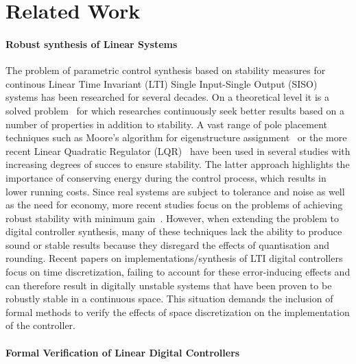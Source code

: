 \documentclass{sig-alternate-05-2015}
\begin{document}
\section{Related Work}

\paragraph{Robust synthesis of Linear Systems} 

The problem of parametric control synthesis based on stability measures for
continous Linear Time Invariant (LTI) Single Input-Single Output (SISO)
systems has been researched for several decades.  On a theoretical level it
is a solved problem~\cite{wonham1967pole} for which researches continuously
seek better results based on a number of properties in addition to
stability.  A vast range of pole placement techniques such as Moore's
algorithm for eigenstructure assignment~\cite{klein1977eigenvalue} or the
more recent Linear Quadratic Regulator (LQR)~\cite{bemporad2002explicit}
have been used in several studies with increasing degrees of succes to
ensure stability.  The latter approach highlights the importance of
conserving energy during the control process, which results in lower running
costs.  Since real systems are subject to tolerance and noise as well as the
need for economy, more recent studies focus on the problems of achieving
robust stability with minimum
gain~\cite{schmid2014unified,konigorski2012pole}.  However, when extending
the problem to digital controller synthesis, many of these techniques lack
the ability to produce sound or stable results because they disregard the
effects of quantisation and rounding.  Recent papers on
implementations/synthesis of LTI digital
controllers~\cite{das2013lqr,ghosh2013fpga} focus on time discretization,
failing to account for these error-inducing effects and can therefore result
in digitally unstable systems that have been proven to be robustly stable in
a continuous space.  This situation demands the inclusion of formal methods
to verify the effects of space discretization on the implementation of the
controller.

\paragraph{Formal Verification of Linear Digital Controllers} 
\end{document}
